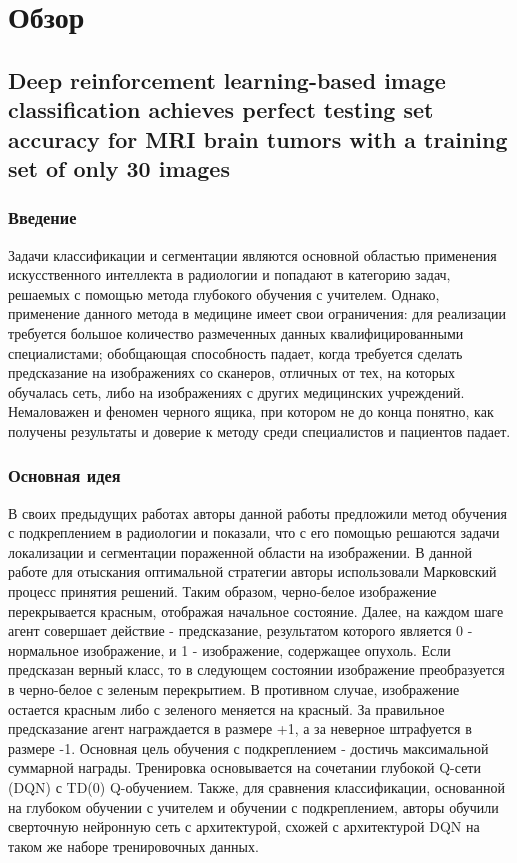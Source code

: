 \section{Обзор}

\subsection*{Deep reinforcement learning-based image classification achieves perfect testing set accuracy for MRI brain tumors with a training set of only 30 images}


\subsubsection*{Введение}
Задачи классификации и сегментации являются основной областью применения искусственного 
интеллекта в радиологии и попадают в категорию задач, решаемых с помощью метода глубокого обучения с учителем. 
Однако, применение данного метода в медицине имеет свои ограничения: для реализации требуется большое количество размеченных данных 
квалифицированными специалистами; обобщающая способность падает, когда требуется сделать предсказание на изображениях со сканеров, отличных от тех, 
на которых обучалась сеть, либо на изображениях с других медицинских учреждений. Немаловажен и феномен \glqq черного ящика\grqq, при котором 
не до конца понятно, как получены результаты и доверие к методу среди специалистов и пациентов падает. 

\subsubsection*{Основная идея}
В своих предыдущих работах \cite{ann1_1, ann1_2, ann1_3} авторы данной работы \cite{ann1} предложили метод обучения с подкреплением в радиологии и показали, 
что с его помощью решаются задачи локализации и сегментации пораженной области на изображении. В данной работе для отыскания 
оптимальной стратегии авторы использовали Марковский процесс принятия решений. Таким образом, черно-белое изображение 
перекрывается красным, отображая начальное состояние. Далее, на каждом шаге агент совершает действие - предсказание, 
результатом которого является 0 - нормальное изображение, и 1 - изображение, содержащее опухоль. Если предсказан верный класс, 
то в следующем состоянии изображение преобразуется в черно-белое с зеленым перекрытием. В противном случае, изображение остается 
красным либо с зеленого меняется на красный. За правильное предсказание агент награждается в размере +1, а за неверное штрафуется 
в размере -1. Основная цель обучения с подкреплением - достичь максимальной суммарной награды. Тренировка основывается 
на сочетании глубокой Q-сети (DQN) с TD(0) Q-обучением. Также, для сравнения классификации, основанной на глубоком обучении 
с учителем и обучении с подкреплением, авторы обучили сверточную нейронную сеть с архитектурой, схожей с архитектурой DQN на таком же наборе 
тренировочных данных.
